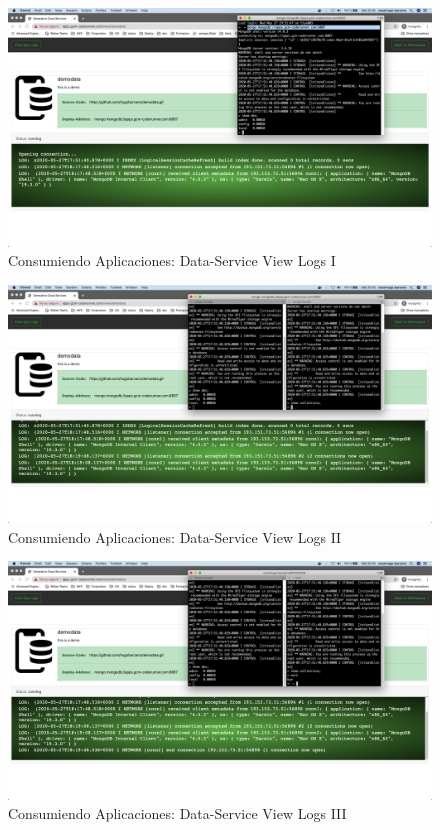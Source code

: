 \documentclass[a4paper,11pt]{book}
\begin{document}
\begin{figure}[H]
\centering
\includegraphics[scale=0.2]{imagenes/casouso/1_14.png}
\caption{  Consumiendo Aplicaciones: Data-Service View Logs I  }
\end{figure}

\begin{figure}[H]
\centering
\includegraphics[scale=0.2]{imagenes/casouso/1_15.png}
\caption{  Consumiendo Aplicaciones: Data-Service View Logs II }
\end{figure}

\begin{figure}[H]
\centering
\includegraphics[scale=0.2]{imagenes/casouso/1_16.png}
\caption{ Consumiendo Aplicaciones: Data-Service View Logs III  }
\end{figure}
\end{document}
